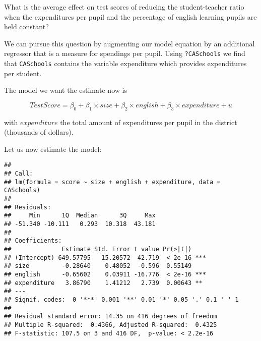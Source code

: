 \documentclass[]{book}
\newenvironment{Shaded}{\begin{snugshade}}{\end{snugshade}}
\newcommand{\KeywordTok}[1]{\textcolor[rgb]{0.13,0.29,0.53}{\textbf{#1}}}
\newcommand{\DataTypeTok}[1]{\textcolor[rgb]{0.13,0.29,0.53}{#1}}
\newcommand{\DecValTok}[1]{\textcolor[rgb]{0.00,0.00,0.81}{#1}}
\newcommand{\StringTok}[1]{\textcolor[rgb]{0.31,0.60,0.02}{#1}}
\newcommand{\CommentTok}[1]{\textcolor[rgb]{0.56,0.35,0.01}{\textit{#1}}}
\newcommand{\OperatorTok}[1]{\textcolor[rgb]{0.81,0.36,0.00}{\textbf{#1}}}
\newcommand{\NormalTok}[1]{#1}
\theoremstyle{definition}
\theoremstyle{definition}
\theoremstyle{definition}
\theoremstyle{remark}
\begin{document}
What is the average effect on test scores of reducing the
student-teacher ratio when the expenditures per pupil and the percentage
of english learning pupils are held constant?

We can pursue this question by augmenting our model equation by an
additional regressor that is a measure for spendings per pupil. Using
\texttt{?CASchools} we find that \texttt{CASchools} contains the
variable expenditure which provides expenditures per student.

The model we want the estimate now is

\[ TestScore = \beta_0 + \beta_1 \times size + \beta_2 \times english + \beta_3 \times expenditure + u \]

with \(expenditure\) the total amount of expenditures per pupil in the
district (thousands of dollars).

Let us now estimate the model:

\begin{Shaded}
\end{Shaded}

\begin{verbatim}
## 
## Call:
## lm(formula = score ~ size + english + expenditure, data = CASchools)
## 
## Residuals:
##     Min      1Q  Median      3Q     Max 
## -51.340 -10.111   0.293  10.318  43.181 
## 
## Coefficients:
##              Estimate Std. Error t value Pr(>|t|)    
## (Intercept) 649.57795   15.20572  42.719  < 2e-16 ***
## size         -0.28640    0.48052  -0.596  0.55149    
## english      -0.65602    0.03911 -16.776  < 2e-16 ***
## expenditure   3.86790    1.41212   2.739  0.00643 ** 
## ---
## Signif. codes:  0 '***' 0.001 '**' 0.01 '*' 0.05 '.' 0.1 ' ' 1
## 
## Residual standard error: 14.35 on 416 degrees of freedom
## Multiple R-squared:  0.4366, Adjusted R-squared:  0.4325 
## F-statistic: 107.5 on 3 and 416 DF,  p-value: < 2.2e-16
\end{verbatim}
\end{document}
